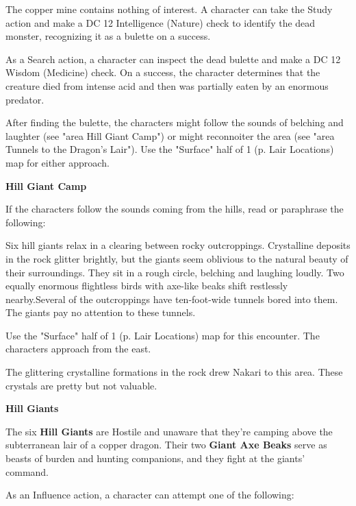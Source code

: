 \documentclass[letterpaper, 11pt, twocolumn]{dndbook}
\begin{document}
The copper mine contains nothing of interest. A character can take the Study action and make a DC 12 Intelligence (Nature) check to identify the dead monster, recognizing it as a bulette on a success.

As a Search action, a character can inspect the dead bulette and make a DC 12 Wisdom (Medicine) check. On a success, the character determines that the creature died from intense acid and then was partially eaten by an enormous predator.

After finding the bulette, the characters might follow the sounds of belching and laughter (see "area Hill Giant Camp") or might reconnoiter the area (see "area Tunnels to the Dragon's Lair"). Use the "Surface" half of 1 (p. Lair Locations) map for either approach.

\textbf{Hill Giant Camp}

If the characters follow the sounds coming from the hills, read or paraphrase the following:

\begin{DndReadAloud}
Six hill giants relax in a clearing between rocky outcroppings. Crystalline deposits in the rock glitter brightly, but the giants seem oblivious to the natural beauty of their surroundings. They sit in a rough circle, belching and laughing loudly. Two equally enormous flightless birds with axe-like beaks shift restlessly nearby.Several of the outcroppings have ten-foot-wide tunnels bored into them. The giants pay no attention to these tunnels.
\end{DndReadAloud}

Use the "Surface" half of 1 (p. Lair Locations) map for this encounter. The characters approach from the east.

The glittering crystalline formations in the rock drew Nakari to this area. These crystals are pretty but not valuable.

\textbf{Hill Giants}

The six \textbf{Hill Giants} are Hostile and unaware that they're camping above the subterranean lair of a copper dragon. Their two \textbf{Giant Axe Beaks} serve as beasts of burden and hunting companions, and they fight at the giants' command.

As an Influence action, a character can attempt one of the following:
\end{document}
